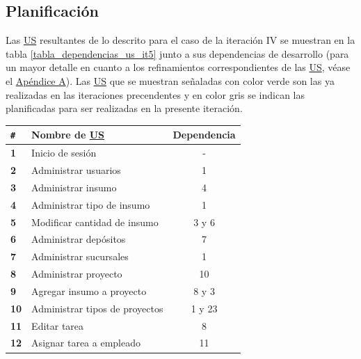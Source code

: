 \documentclass[a4paper, 12pt,twoside]{report}  %
\numberwithin{equation}{subsection} %
\begin{document}
\subsection{Planificación}
Las \hyperlink{US}{US} resultantes de lo descrito para el caso de la iteración IV se muestran en la tabla \ref{tabla_dependencias_us_it5} junto a sus dependencias de desarrollo (para un mayor detalle en cuanto a los refinamientos correspondientes de las \hyperlink{US}{US}, véase el \hyperlink{apendice_a}{Apéndice A}). Las \hyperlink{US}{US} que se muestran señaladas con color verde son las ya realizadas en las iteraciones precendentes y en color gris se indican las planificadas para ser realizadas en la presente iteración.

\begin{table}[h!]
	\centering
	\begin{tabular}{ |p{0.5cm}|p{10cm}|c|  }
		\hline
		\verb|#|& \textbf{Nombre de \hyperlink{US}{US}}& \textbf{Dependencia} \\
		\hline
		\textbf{1} & \cellcolor{marca_US_realizada_anterior}Inicio de sesión & - \\
		\hline
		\textbf{2} & \cellcolor{marca_US_realizada_anterior}Administrar usuarios & 1 \\
		\hline
		\textbf{3} & \cellcolor{marca_US_realizada_anterior}Administrar insumo & 4 \\
		\hline
		\textbf{4} & \cellcolor{marca_US_realizada_anterior}Administrar tipo de insumo & 1 \\
		\hline
		\textbf{5} & \cellcolor{marca_US_realizada_anterior}Modificar cantidad de insumo & 3 y 6 \\
		\hline
		\textbf{6} & \cellcolor{marca_US_realizada_anterior}Administrar depósitos & 7 \\
		\hline
		\textbf{7} & \cellcolor{marca_US_realizada_anterior}Administrar sucursales & 1 \\
		\hline
		\textbf{8} & \cellcolor{marca_US_realizada_anterior}Administrar proyecto & 10 \\
		\hline
		\textbf{9} & \cellcolor{marca_US_realizada_anterior}Agregar insumo a proyecto & 8 y 3 \\
		\hline
		\textbf{10} & \cellcolor{marca_US_realizada_anterior}Administrar tipos de proyectos & 1 y 23 \\
		\hline
		\textbf{11} & \cellcolor{marca_US_realizada_anterior}Editar tarea & 8 \\
		\hline
		\textbf{12} & \cellcolor{marca_US_realizada_anterior}Asignar tarea a empleado & 11\\

\end{tabular}
\end{table}
\end{document}
